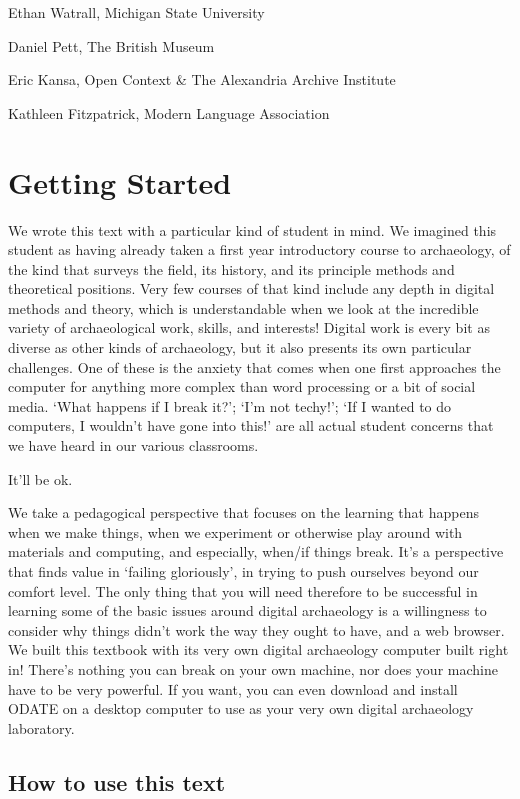\documentclass[english,]{book}
\begin{document}
Ethan Watrall, Michigan State University

Daniel Pett, The British Museum

Eric Kansa, Open Context \& The Alexandria Archive Institute

Kathleen Fitzpatrick, Modern Language Association

\chapter*{Getting Started}\label{getting-started}

We wrote this text with a particular kind of student in mind. We
imagined this student as having already taken a first year introductory
course to archaeology, of the kind that surveys the field, its history,
and its principle methods and theoretical positions. Very few courses of
that kind include any depth in digital methods and theory, which is
understandable when we look at the incredible variety of archaeological
work, skills, and interests! Digital work is every bit as diverse as
other kinds of archaeology, but it also presents its own particular
challenges. One of these is the anxiety that comes when one first
approaches the computer for anything more complex than word processing
or a bit of social media. `What happens if I break it?'; `I'm not
techy!'; `If I wanted to do computers, I wouldn't have gone into this!'
are all actual student concerns that we have heard in our various
classrooms.

It'll be ok.

We take a pedagogical perspective that focuses on the learning that
happens when we make things, when we experiment or otherwise play around
with materials and computing, and especially, when/if things break. It's
a perspective that finds value in `failing gloriously', in trying to
push ourselves beyond our comfort level. The only thing that you will
need therefore to be successful in learning some of the basic issues
around digital archaeology is a willingness to consider why things
didn't work the way they ought to have, and a web browser. We built this
textbook with its very own digital archaeology computer built right in!
There's nothing you can break on your own machine, nor does your machine
have to be very powerful. If you want, you can even download and install
ODATE on a desktop computer to use as your very own digital archaeology
laboratory.

\section*{How to use this text}\label{how-to-use-this-text}
\end{document}
